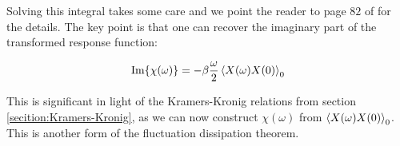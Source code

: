 \noindent Solving this integral takes some care and we point the reader to page $82$ of \cite{LiviPoliti2017} for the details. The key point is that one can recover the imaginary part of the transformed response function:

\begin{align}
\Im{ \chi(\omega)} = - \beta \frac{\omega}{2} \expval{X(\omega)X(0)}_0
\end{align}

\noindent This is significant in light of the Kramers-Kronig relations from section \ref{secition:Kramers-Kronig}, as we can now construct $\chi(\omega)$ from $\expval{X(\omega)X(0)}_0$. This is another form of the fluctuation dissipation theorem.